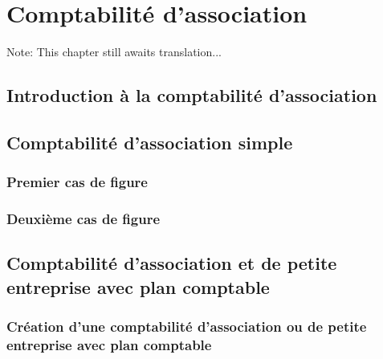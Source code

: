 

\chapter{Comptabilité d'association\label{association}}

Note: This chapter still awaits translation...


\section{Introduction à la comptabilité d'association\label{association-intro}}


\section{Comptabilité d'association simple\label{asso-simple}}


\subsection{Premier cas de figure\label{asso-simple-firstCase}}


\subsection{Deuxième cas de figure\label{asso-simple-secondCase} }


\section{Comptabilité d'association et de petite entreprise avec plan comptable\label{association-plan}}


\subsection{Création d'une comptabilité d'association ou de petite entreprise avec plan comptable\label{association-plan-creation}}


